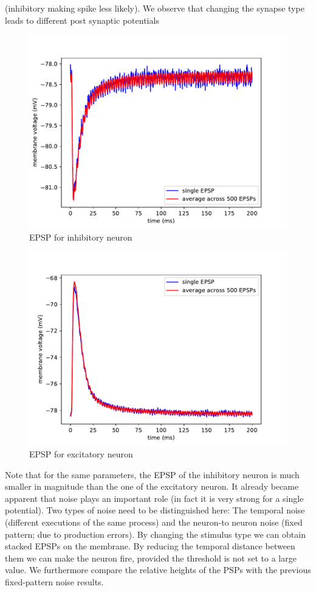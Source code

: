 \documentclass[a4paper,twocolumn]{article}
\begin{document}
(inhibitory making spike less likely).  We observe that changing the synapse type 
leads to different post synaptic potentials
\begin{figure}[ht]
    \centering
    \includegraphics[width=.5\textwidth]{figures/epsp_inh_fall_03_out_05.pdf}
    \caption{EPSP for inhibitory neuron}
    \label{fig:epsp_inh_fall}
\end{figure}
\begin{figure}[ht]
    \centering
    \includegraphics[width=.5\textwidth]{figures/epsp_exc_fall_03_out_05.pdf}
    \caption{EPSP for excitatory neuron}
    \label{fig:epsp_exc_fall}
\end{figure}
Note that for the same parameters,  the EPSP of the inhibitory neuron is much 
smaller in magnitude than the one of the excitatory neuron.
It already became apparent that noise plays an important role (in fact it is very 
strong for a single potential).  Two types of noise need to be distinguished here: 
The temporal noise (different executions of the same process) and the neuron-to 
neuron noise (fixed pattern; due to production errors).
By changing the stimulus type we can obtain stacked EPSPs on the membrane.  By 
reducing the temporal distance between them we can make the neuron fire, provided 
the threshold is not set to a large value.  We furthermore compare the relative 
heights of the PSPs with the previous fixed-pattern noise results.
\end{document}
